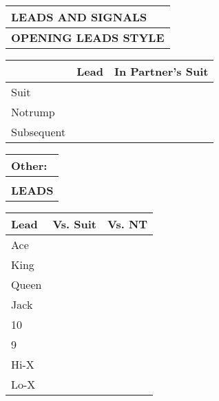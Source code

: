 \documentclass{article}
\begin{document}
\begin{minipage}{5mm}
	\begin{tabular}{| p{5mm} |}
	\end{tabular}
\end{minipage}
\begin{minipage}{90mm}
	\begin{tabular}{| p{88mm} |}
		\hline
		\cellcolor[gray]{0.9} \textbf{LEADS AND SIGNALS} \\ \hline
		\textbf{OPENING LEADS STYLE} \\ \hline
	\end{tabular}
	\begin{tabular}{| p{15.25mm} | p{32mm} | p{32mm} |}
		& Lead & In Partner's Suit \\ \hline
		Suit & & \\ \hline
		Notrump & & \\ \hline
		Subsequent & & \\ \hline
	\end{tabular}
	\begin{tabular}{| p{88mm} |}
		Other: \\ \hline
		\\ \hline
		\textbf{LEADS} \\ \hline
	\end{tabular}
	\begin{tabular}{| p{15.25mm} | p{32mm} | p{32mm} |}
		Lead & Vs. Suit & Vs. NT \\ \hline
		Ace & & \\ \hline
		King & & \\ \hline
		Queen & & \\ \hline
		Jack & & \\ \hline
		10 & & \\ \hline
		9 & & \\ \hline
		Hi-X &  & \\ \hline
		Lo-X & & \\ \hline
	\end{tabular}
	\begin{tabular}{| p{88mm} |}


\end{tabular}
\end{minipage}
\end{document}
